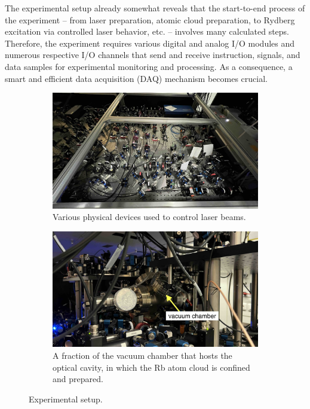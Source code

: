 The experimental setup already somewhat reveals that the start-to-end process of the experiment -- from laser preparation, atomic cloud preparation, to Rydberg excitation via controlled laser behavior, etc. -- involves many calculated steps. Therefore, the experiment requires various digital and analog I/O modules and numerous respective I/O channels that send and receive instruction, signals, and data samples for experimental monitoring and processing. As a consequence, a smart and efficient data acquisition (DAQ) mechanism becomes crucial.

\begin{figure}[ht]
    \centering
    \begin{subfigure}[t]{0.48\linewidth}
        \centering
        \includegraphics[width=\textwidth]{images/chapter_1/lenses.jpg}
        \caption{Various physical devices used to control laser beams.}
        \label{fig:ch1_lenses}
    \end{subfigure}
    \hspace{.025\linewidth}
    \begin{subfigure}[t]{0.48\linewidth}
        \centering
        \includegraphics[width=\textwidth]{images/chapter_1/cavity.jpeg}
        \caption{A fraction of the vacuum chamber that hosts the optical cavity, in which the Rb atom cloud is confined and prepared.}
        \label{fig:ch1_cavity}
    \end{subfigure}
    \caption{Experimental setup.}
    \label{fig:ch1_exp_setup}
\end{figure}